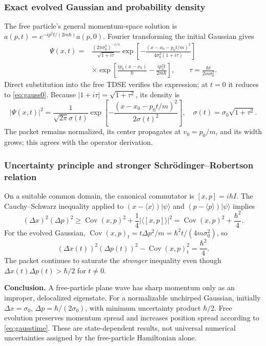 \documentclass[11pt,a4paper]{article}
\newcommand{\Cov}{\operatorname{Cov}}
\begin{document}
\subsubsection{Exact evolved Gaussian and probability density}
The free particle's general momentum-space solution is $a(p,t)=e^{-ip^2t/(2m\hbar)}a(p,0)$. Fourier transforming the initial Gaussian gives
\begin{equation}\label{eq:gauss_evolved}
\boxed{\begin{aligned}
\Psi(x,t)={}&\frac{(2\pi\sigma_0^2)^{-1/4}}{\sqrt{1+i\tau}}
\exp\!\left[-\frac{(x-x_0-p_0t/m)^2}{4\sigma_0^2(1+i\tau)}\right]\\
&\times\exp\!\left[\frac{ip_0(x-x_0)}\hbar-\frac{ip_0^2t}{2m\hbar}\right],
\qquad \tau=\frac{\hbar t}{2m\sigma_0^2}.
\end{aligned}}
\end{equation}
Direct substitution into the free TDSE verifies the expression; at $t=0$ it reduces to \eqref{eq:gauss0}. Because $|1+i\tau|=\sqrt{1+\tau^2}$, its density is
\begin{equation}
\boxed{|\Psi(x,t)|^2=\frac1{\sqrt{2\pi}\sigma(t)}
\exp\left[-\frac{(x-x_0-p_0t/m)^2}{2\sigma(t)^2}\right]},\quad
\sigma(t)=\sigma_0\sqrt{1+\tau^2}.
\end{equation}
The packet remains normalized, its center propagates at $v_0=p_0/m$, and its width grows; this agrees with the operator derivation.

\subsubsection{Uncertainty principle and stronger Schrödinger--Robertson relation}
On a suitable common domain, the canonical commutator is $[x,p]=i\hbar I$. The Cauchy--Schwarz inequality applied to $(x-\langle x\rangle)|\psi\rangle$ and $(p-\langle p\rangle)|\psi\rangle$ implies
\begin{equation}
(\Delta x)^2(\Delta p)^2\ge\Cov(x,p)^2+\frac14|\langle[x,p]\rangle|^2
=\Cov(x,p)^2+\frac{\hbar^2}{4}.
\end{equation}
For the evolved Gaussian, $\Cov(x,p)_t=t\Delta p^2/m=\hbar^2t/(4m\sigma_0^2)$, so
\begin{equation}
(\Delta x(t))^2(\Delta p(t))^2-\Cov(x,p)_t^2=\boxed{\frac{\hbar^2}{4}}.
\end{equation}
The packet continues to saturate the \emph{stronger} inequality even though $\Delta x(t)\Delta p(t)>\hbar/2$ for $t\ne0$.
\par\textbf{Conclusion.} A free-particle plane wave has sharp momentum only as an improper, delocalized eigenstate. For a normalizable unchirped Gaussian, initially $\Delta x=\sigma_0$, $\Delta p=\hbar/(2\sigma_0)$, with minimum uncertainty product $\hbar/2$. Free evolution preserves momentum spread and increases position spread according to \eqref{eq:gausstime}. These are state-dependent results, not universal numerical uncertainties assigned by the free-particle Hamiltonian alone.
\end{document}
